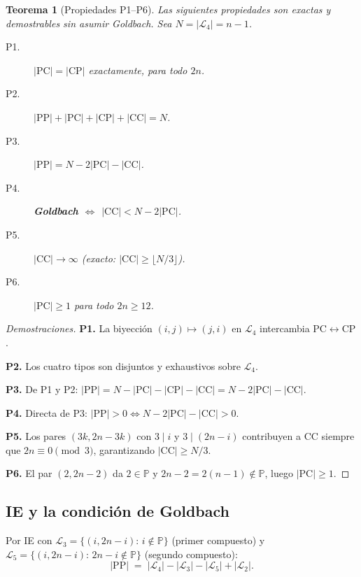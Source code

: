 \documentclass[11pt,a4paper]{article}
\newtheorem{theorem}{Teorema}
\theoremstyle{definition}
\newcommand{\PP}{\mathbb{P}}          %
\begin{document}
\begin{theorem}[Propiedades P1--P6]\label{thm:props}
Las siguientes propiedades son exactas y demostrables sin asumir Goldbach.
Sea $N=|\mathcal{L}_4|=n-1$.

\begin{description}
    \item[P1.] $|\mathrm{PC}|=|\mathrm{CP}|$ exactamente, para todo $2n$.
    \item[P2.] $|\mathrm{PP}|+|\mathrm{PC}|+|\mathrm{CP}|+|\mathrm{CC}|=N$.
    \item[P3.] $|\mathrm{PP}|=N-2|\mathrm{PC}|-|\mathrm{CC}|$.
    \item[P4.] \textbf{Goldbach $\Leftrightarrow$ $|\mathrm{CC}|<N-2|\mathrm{PC}|$}.
    \item[P5.] $|\mathrm{CC}|\to\infty$ (exacto: $|\mathrm{CC}|\geq\lfloor N/3\rfloor$).
    \item[P6.] $|\mathrm{PC}|\geq1$ para todo $2n\geq12$.
\end{description}
\end{theorem}
\begin{proof}[Demostraciones]
\textbf{P1.} La biyección $(i,j)\mapsto(j,i)$ en $\mathcal{L}_4$ intercambia
$\mathrm{PC}\leftrightarrow\mathrm{CP}$.

\textbf{P2.} Los cuatro tipos son disjuntos y exhaustivos sobre $\mathcal{L}_4$.

\textbf{P3.} De P1 y P2: $|\mathrm{PP}|=N-|\mathrm{PC}|-|\mathrm{CP}|-|\mathrm{CC}|
=N-2|\mathrm{PC}|-|\mathrm{CC}|$.

\textbf{P4.} Directa de P3: $|\mathrm{PP}|>0\Leftrightarrow N-2|\mathrm{PC}|-|\mathrm{CC}|>0$.

\textbf{P5.} Los pares $(3k, 2n-3k)$ con $3\mid i$ y $3\mid(2n-i)$ contribuyen
a CC siempre que $2n\equiv0\pmod3$, garantizando $|\mathrm{CC}|\geq N/3$.

\textbf{P6.} El par $(2,2n-2)$ da $2\in\PP$ y $2n-2=2(n-1)\notin\PP$,
luego $|\mathrm{PC}|\geq1$.
\end{proof}

\subsection{IE y la condición de Goldbach}

Por IE con $\mathcal{L}_3=\{(i,2n-i):\,i\notin\PP\}$ (primer compuesto) y
$\mathcal{L}_5=\{(i,2n-i):\,2n-i\notin\PP\}$ (segundo compuesto):
\[
    |\mathrm{PP}| \;=\; |\mathcal{L}_4| - |\mathcal{L}_3| - |\mathcal{L}_5| + |\mathcal{L}_2|.
\]
\end{document}
